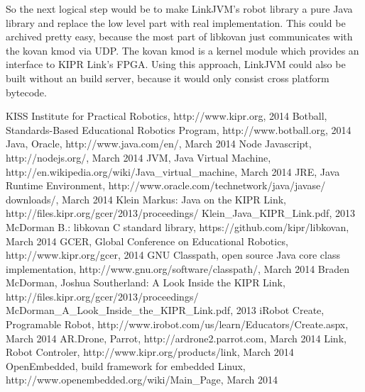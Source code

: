 \documentclass{juniorjournal}
\begin{document}
So the next logical step would be to make LinkJVM's robot library a pure Java\cite{Java} library and replace the low level part with real implementation.
This could be archived pretty easy, because the most part of libkovan\cite{libkovan} just communicates with the kovan kmod via UDP. 
The kovan kmod is a kernel module which provides an interface to KIPR\cite{KIPR} Link's\cite{link} FPGA.
Using this approach, LinkJVM could also be built without an build server, because it would only consist cross platform bytecode. 

\begin{thebibliography}{500} %
  KISS Institute for Practical Robotics,
  http://www.kipr.org, 2014
  Botball, Standards-Based Educational Robotics Program, 
  http://www.botball.org, 2014
  Java, Oracle,
  http://www.java.com/en/, March 2014
  Node Javascript, 
  http://nodejs.org/, March 2014
  JVM, Java Virtual Machine,
  http://en.wikipedia.org/wiki/Java\_virtual\_machine, March 2014
  JRE, Java Runtime Environment, 
  http://www.oracle.com/technetwork/java/javase/
  downloads/, March 2014
  Klein Markus: \frqq Java on the KIPR Link\flqq  ,
  http://files.kipr.org/gcer/2013/proceedings/
  Klein\_Java\_KIPR\_Link.pdf, 2013
  McDorman B.: libkovan C standard library,
  https://github.com/kipr/libkovan, March 2014
  GCER, Global Conference on Educational Robotics,
  http://www.kipr.org/gcer, 2014
  GNU Classpath, open source Java core class implementation,
  http://www.gnu.org/software/classpath/, March 2014
  Braden McDorman, Joshua Southerland: \frqq A Look Inside the KIPR Link\flqq  ,
  http://files.kipr.org/gcer/2013/proceedings/
  McDorman\_A\_Look\_Inside\_the\_KIPR\_Link.pdf, 2013
  iRobot Create, Programable Robot,
  http://www.irobot.com/us/learn/Educators/Create.aspx, March 2014
  AR.Drone, Parrot,
  http://ardrone2.parrot.com, March 2014
  Link, Robot Controler,
  http://www.kipr.org/products/link, March 2014
  OpenEmbedded, build framework for embedded Linux,
  http://www.openembedded.org/wiki/Main\_Page, March 2014
\end{thebibliography}
\end{document}

